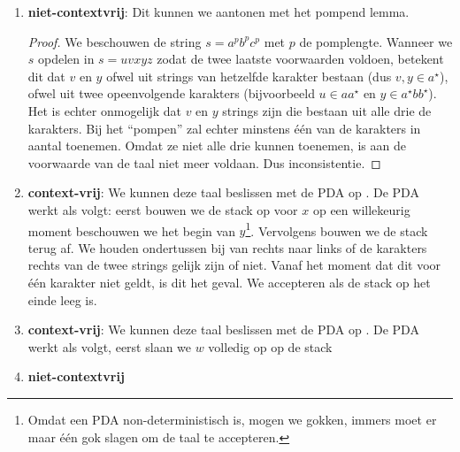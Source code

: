 \documentclass[a4paper]{article}
\begin{document}
\begin{question}
\begin{answer}
\begin{enumerate}
\begin{proof}
\end{proof}
\item \textbf{niet-contextvrij}: Dit kunnen we aantonen met het pompend lemma.
\begin{proof}
We beschouwen de string $s=a^pb^pc^p$ met $p$ de pomplengte. Wanneer we $s$ opdelen in $s=uvxyz$ zodat de twee laatste voorwaarden voldoen, betekent dit dat $v$ en $y$ ofwel uit strings van hetzelfde karakter bestaan (dus $v,y\in a^{\star}$), ofwel uit twee opeenvolgende karakters (bijvoorbeeld $u\in aa^{\star}$ en $y\in a^{\star}bb^{\star}$). Het is echter onmogelijk dat $v$ en $y$ strings zijn die bestaan uit alle drie de karakters. Bij het ``pompen'' zal echter minstens \'e\'en van de karakters in aantal toenemen. Omdat ze niet alle drie kunnen toenemen, is aan de voorwaarde van de taal niet meer voldaan. Dus inconsistentie.
\end{proof}
\item \textbf{context-vrij}: We kunnen deze taal beslissen met de PDA op \figref{}. De PDA werkt als volgt: eerst bouwen we de stack op voor $x$ op een willekeurig moment beschouwen we het begin van $y$\footnote{Omdat een PDA non-deterministisch is, mogen we gokken, immers moet er maar \'e\'en gok slagen om de taal te accepteren.}. Vervolgens bouwen we de stack terug af. We houden ondertussen bij van rechts naar links of de karakters rechts van de twee strings gelijk zijn of niet. Vanaf het moment dat dit voor \'e\'en karakter niet geldt, is dit het geval. We accepteren als de stack op het einde leeg is.
\item \textbf{context-vrij}: We kunnen deze taal beslissen met de PDA op \figref{}. De PDA werkt als volgt, eerst slaan we $w$ volledig op op de stack
\item \textbf{niet-contextvrij}
\end{enumerate}
\end{answer}
\end{question}
\end{document}
